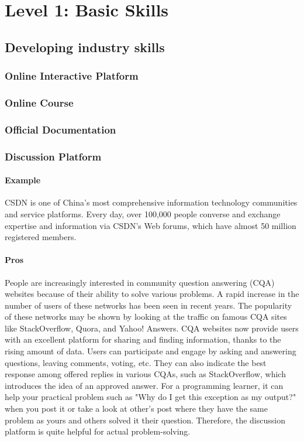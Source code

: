 \documentclass[a4paper, 11pt]{report}
\begin{document}
\newpage
\section{Level 1: Basic Skills}

\subsection{Developing industry skills}

\subsubsection{Online Interactive Platform}

\subsubsection{Online Course}

\subsubsection{Official Documentation}

\subsubsection{Discussion Platform}

\paragraph{Example}
CSDN is one of China's most comprehensive information technology communities and service platforms. Every day, over 100,000 people converse and exchange expertise and information via CSDN's Web forums, which have almost 50 million registered members. \cite{(Xing et al., 2019)}\\

\paragraph{Pros}
People are increasingly interested in community question answering (CQA) websites because of their ability to solve various problems. A rapid increase in the number of users of these networks has been seen in recent years. The popularity of these networks may be shown by looking at the traffic on famous CQA sites like StackOverflow, Quora, and Yahoo! Answers. CQA websites now provide users with an excellent platform for sharing and finding information, thanks to the rising amount of data. Users can participate and engage by asking and answering questions, leaving comments, voting, etc. They can also indicate the best response among offered replies in various CQAs, such as StackOverflow, which introduces the idea of an approved answer. \cite{(Dargahi Nobari et al., 2020)} For a programming learner, it can help your practical problem such as "Why do I get this exception as my output?" when you post it or take a look at other's post where they have the same problem as yours and others solved it their question. Therefore, the discussion platform is quite helpful for actual problem-solving.\\
\end{document}
